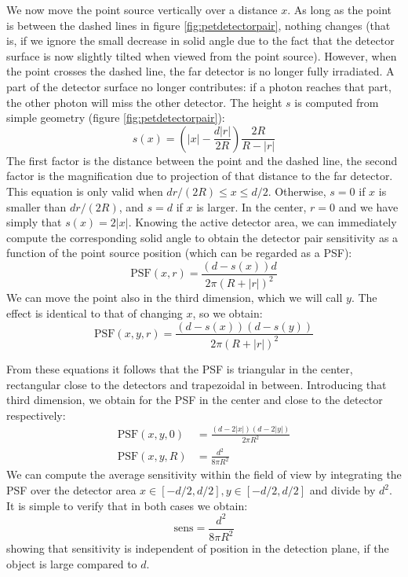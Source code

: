 \documentclass[11pt,oneside]{book}
\begin{document}
We now move the point source vertically over a distance $x$. As long as the
point is between the dashed lines in figure \ref{fig:petdetectorpair}, nothing
changes (that is, if we ignore the small decrease in solid angle due to the
fact that the detector surface is now slightly tilted when viewed from the
point source). However, when the point crosses the dashed line, the far
detector is no longer fully irradiated. A part of the detector surface no
longer contributes: if a photon reaches that part, the other photon will miss
the other detector. The height $s$ is computed from simple geometry (figure
\ref{fig:petdetectorpair}):
\begin{equation}
  s(x) = \left( |x| - \frac{d |r|}{2 R} \right) \frac{2R}{R-|r|}
\end{equation}
The first factor is the distance between the point and the dashed line, the
second factor is the magnification due to projection of that distance to the
far detector. This equation is only valid when $d r / (2R) \leq x \leq
d/2$. Otherwise, $s = 0$ if $x$ is smaller than $dr/(2R)$, and $s = d$ if $x$
is larger. In the center, $r = 0$ and we have simply that $s(x) = 2 |x|$.
Knowing the active detector area, we can immediately compute the
corresponding solid angle to obtain the detector pair sensitivity as a
function of the point source position (which can be regarded as a PSF):
\begin{equation}
 \mbox{PSF}(x, r) = \frac{(d - s(x)) d}{2 \pi (R+|r|)^2}
\end{equation}
We can move the point also in the third dimension, which we will call $y$. The
effect is identical to that of changing $x$, so we obtain:
\begin{equation}
 \mbox{PSF}(x, y, r) = \frac{(d - s(x)) (d - s(y))}{2 \pi (R+|r|)^2}
\end{equation}

From these equations it follows that the PSF is triangular in the center,
rectangular close to the detectors and trapezoidal in between.  Introducing
that third dimension, we obtain for the PSF in the center and close to the
detector respectively:
\begin{align}
  \mbox{PSF}(x, y, 0) &= \frac{(d - 2|x|)(d - 2 |y|)}{2 \pi R^2}\\
  \mbox{PSF}(x, y, R) &= \frac{d^2}{8 \pi R^2}
\end{align}
We can compute the average sensitivity within the field of view by integrating
the PSF over the detector area $x \in [-d/2, d/2], y \in [-d/2,
d/2]$ and divide by $d^2$. It is simple to verify that in both cases we obtain:
\begin{equation}
  \mbox{sens} = \frac{d^2}{8 \pi R^2} \label{eq:pet_totsens}
\end{equation}
showing that sensitivity is independent of position in the detection plane, if
the object is large compared to $d$.
\end{document}
